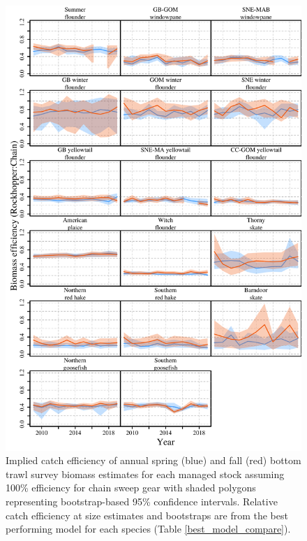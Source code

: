 \documentclass[
  12pt,
]{article}
\begin{document}
\begin{figure}
\caption{Implied catch efficiency of annual spring (blue) and fall (red) bottom trawl survey biomass estimates for each managed stock assuming 100\% efficiency for chain sweep gear with shaded polygons representing bootstrap-based 95\% confidence intervals. Relative catch efficiency at size estimates and bootstraps are from the best performing model for each species (Table \ref{best_model_compare}).}\label{stock_biomass_efficiency_plot}
\begin{center}
\includegraphics[height = 0.8\textheight]{stock_biomass_efficiency_plot.pdf}
\end{center}
\end{figure}

\clearpage
\end{document}
